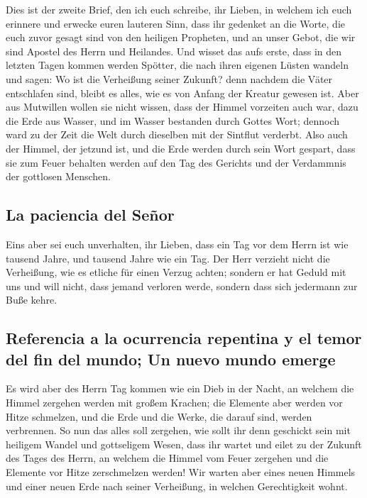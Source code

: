  Dies ist der zweite Brief, den ich euch schreibe, ihr
Lieben, in welchem ich euch erinnere und erwecke euren lauteren Sinn,
 dass ihr gedenket an die Worte, die euch zuvor gesagt
sind von den heiligen Propheten, und an unser Gebot, die wir sind
Apostel des Herrn und Heilandes.  Und wisset das aufs
erste, dass in den letzten Tagen kommen werden Spötter, die nach ihren
eigenen Lüsten wandeln  und sagen: Wo ist die Verheißung
seiner Zukunft? denn nachdem die Väter entschlafen sind, bleibt es
alles, wie es von Anfang der Kreatur gewesen ist.  Aber
aus Mutwillen wollen sie nicht wissen, dass der Himmel vorzeiten auch
war, dazu die Erde aus Wasser, und im Wasser bestanden durch Gottes
Wort;  dennoch ward zu der Zeit die Welt durch dieselben
mit der Sintflut verderbt.  Also auch der Himmel, der
jetzund ist, und die Erde werden durch sein Wort gespart, dass sie zum
Feuer behalten werden auf den Tag des Gerichts und der Verdammnis der
gottlosen Menschen.

\hypertarget{la-paciencia-del-seuxf1or}{%
\subsection{La paciencia del Señor}\label{la-paciencia-del-seuxf1or}}

 Eins aber sei euch unverhalten, ihr Lieben, dass ein Tag
vor dem Herrn ist wie tausend Jahre, und tausend Jahre wie ein Tag.
 Der Herr verzieht nicht die Verheißung, wie es etliche
für einen Verzug achten; sondern er hat Geduld mit uns und will nicht,
dass jemand verloren werde, sondern dass sich jedermann zur Buße kehre.

\hypertarget{referencia-a-la-ocurrencia-repentina-y-el-temor-del-fin-del-mundo-un-nuevo-mundo-emerge}{%
\subsection{Referencia a la ocurrencia repentina y el temor del fin del
mundo; Un nuevo mundo
emerge}\label{referencia-a-la-ocurrencia-repentina-y-el-temor-del-fin-del-mundo-un-nuevo-mundo-emerge}}

 Es wird aber des Herrn Tag kommen wie ein Dieb in der
Nacht, an welchem die Himmel zergehen werden mit großem Krachen; die
Elemente aber werden vor Hitze schmelzen, und die Erde und die Werke,
die darauf sind, werden verbrennen.  So nun das alles
soll zergehen, wie sollt ihr denn geschickt sein mit heiligem Wandel und
gottseligem Wesen,  dass ihr wartet und eilet zu der
Zukunft des Tages des Herrn, an welchem die Himmel vom Feuer zergehen
und die Elemente vor Hitze zerschmelzen werden!  Wir
warten aber eines neuen Himmels und einer neuen Erde nach seiner
Verheißung, in welchen Gerechtigkeit wohnt.

